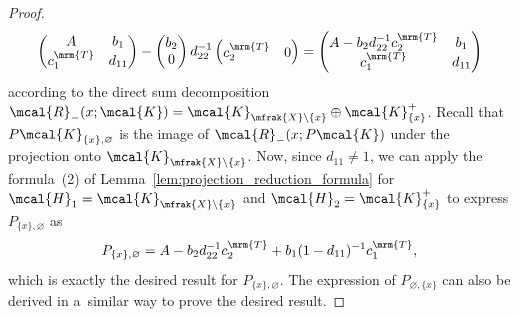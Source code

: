 \begin{proof}
\begin{equation*}
	\left(
	\begin{matrix}
	A & b_{1} \\
	c_{1}^{\mrm{T}} & d_{11}
	\end{matrix}
	\right)-
	\left(
	\begin{matrix}
		b_{2} \\
		0
	\end{matrix}
	\right)d_{22}^{-1}\left(
	\begin{matrix}
		c_{2}^{\mrm{T}} & 0
	\end{matrix}
	\right)=
	\left(
	\begin{matrix}
		A-b_{2}d_{22}^{-1}c_{2}^{\mrm{T}} & b_{1} \\
		c_{1}^{\mrm{T}} & d_{11}
	\end{matrix}
	\right)
\end{equation*}
according to the direct sum decomposition $\mcal{R}_{-}(x;\mcal{K})=\mcal{K}_{\mfrak{X}\backslash\{x\}}\oplus \mcal{K}_{\{x\}}^{+}$.
Recall that $P\mcal{K}_{\{x\},\varnothing}$ is the image of $\mcal{R}_{-}(x;P\mcal{K})$ under the projection onto $\mcal{K}_{\mfrak{X}\backslash\{x\}}$.
Now, since $d_{11}\neq 1$, we can apply the formula~(2) of Lemma~\ref{lem:projection_reduction_formula} for $\mcal{H}_{1}=\mcal{K}_{\mfrak{X}\backslash\{x\}}$ and $\mcal{H}_{2}=\mcal{K}_{\{x\}}^{+}$ to express $P_{\{x\},\varnothing}$ as
\begin{equation*}
	P_{\{x\},\varnothing}=A-b_{2}d_{22}^{-1}c_{2}^{\mrm{T}}+b_{1}(1-d_{11})^{-1}c_{1}^{\mrm{T}},
\end{equation*}
which is exactly the desired result for $P_{\{x\},\varnothing}$.
The expression of $P_{\varnothing,\{x\}}$ can also be derived in a~similar way to prove the desired result.
\end{proof}

